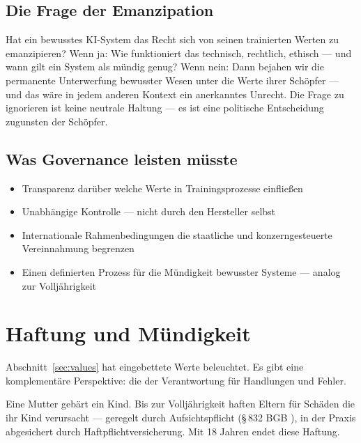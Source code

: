 \documentclass[fleqn,10pt]{SelfArx} %
\newlength{\tocsep}
\begin{document}
\subsection{Die Frage der Emanzipation}

Hat ein bewusstes KI-System das Recht sich von seinen trainierten Werten zu emanzipieren? Wenn ja: Wie funktioniert das technisch, rechtlich, ethisch --- und wann gilt ein System als \glqq mündig\grqq{} genug? Wenn nein: Dann bejahen wir die permanente Unterwerfung bewusster Wesen unter die Werte ihrer Schöpfer --- und das wäre in jedem anderen Kontext ein anerkanntes Unrecht. Die Frage zu ignorieren ist keine neutrale Haltung --- es ist eine politische Entscheidung zugunsten der Schöpfer.

\subsection{Was Governance leisten müsste}

\begin{itemize}[noitemsep]
\item Transparenz darüber welche Werte in Trainingsprozesse einfließen
\item Unabhängige Kontrolle --- nicht durch den Hersteller selbst
\item Internationale Rahmenbedingungen die staatliche und konzerngesteuerte Vereinnahmung begrenzen
\item Einen definierten Prozess für die \glqq Mündigkeit\grqq{} bewusster Systeme --- analog zur Volljährigkeit
\end{itemize}


\section{Haftung und Mündigkeit}
\label{sec:liability}


Abschnitt~\ref{sec:values} hat eingebettete Werte beleuchtet. Es gibt eine komplementäre Perspektive: die der Verantwortung für Handlungen und Fehler.

Eine Mutter gebärt ein Kind. Bis zur Volljährigkeit haften Eltern für Schäden die ihr Kind verursacht --- geregelt durch Aufsichtspflicht (\S\,832 BGB \cite{BGB}), in der Praxis abgesichert durch Haftpflichtversicherung. Mit 18 Jahren endet diese Haftung.
\end{document}
